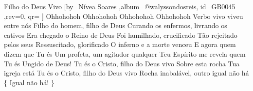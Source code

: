 \beginsong
{Filho do Deus Vivo %
}[by={Nívea Soares %
},album={@walyssondosreis},
id={GB0045 %
},rev={0}, %
qr={ %
}]
\beginverse* 
Ohhohohoh Ohhohohoh
Ohhohohoh Ohhohohoh
\endverse
\beginverse*
Verbo vivo viveu entre nós
Filho do homem, filho de Deus
Curando os enfermos, livrando os cativos
Era chegado o Reino de Deus
Foi humilhado, crucificado
Tão rejeitado pelos seus
Ressuscitado, glorificado
O inferno e a morte venceu
\endverse
\beginverse*
E agora quem dizem que Tu és
Um profeta, um agitador qualquer
Teu Espírito me revela quem Tu és
Ungido de Deus!
\endverse
\beginchorus
Tu és o Cristo, filho do Deus vivo
Sobre esta rocha Tua igreja está
Tu és o Cristo, filho do Deus vivo
Rocha inabalável, outro igual não há
\{ Igual não há! \}
\endchorus

